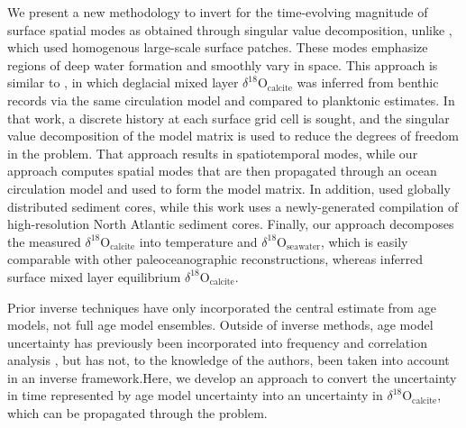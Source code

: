 \documentclass[draft]{agujournal2019}
\begin{document}
We present a new methodology to invert for the time-evolving magnitude
of surface spatial modes as obtained through singular value
decomposition, unlike , which used homogenous large-scale surface patches. These modes emphasize regions of deep water formation
and smoothly vary in space. This approach is similar to
, in which deglacial mixed layer
$\delta^{18}\mathrm{O}_{\mathrm{calcite}}$ was inferred from benthic
records via the same circulation model and compared to planktonic
estimates. In that work, a discrete history at each surface grid cell
is sought, and the singular value decomposition of the model matrix is
used to reduce the degrees of freedom in the problem. That approach
results in spatiotemporal modes, while our approach computes spatial
modes that are then propagated through an ocean circulation model and
used to form the model matrix. In addition,
 used globally distributed
sediment cores, while this work uses a newly-generated compilation of
high-resolution North Atlantic sediment cores. Finally, our approach
decomposes the measured $\delta^{18}\mathrm{O}_{\mathrm{calcite}}$ into
temperature and $\delta^{18}\mathrm{O}_{\mathrm{seawater}}$, which is easily
comparable with other paleoceanographic
reconstructions, whereas
 inferred surface mixed layer
equilibrium $\delta^{18}\mathrm{O}_{\mathrm{calcite}}$.

Prior inverse techniques \cite[]{Burke-Marchal-2011:Application,
  Gebbie-2012:Tracer, Amrhein-Gebbie-2015:Inferring}
have only incorporated the central estimate
from age models, not full
age model ensembles. Outside of
inverse methods, age model uncertainty has previously been
incorporated into frequency and correlation analysis
\cite[]{Khider-Emile-Geay-2022:Pyleoclim}, but has not, to the
knowledge of the authors, been taken into account in an inverse
framework.Here, we develop an approach to convert the uncertainty in time represented
by age model uncertainty into an uncertainty in $\delta^{18}\mathrm{O}_{\mathrm{calcite}}$, which can be propagated through the problem.
\end{document}
